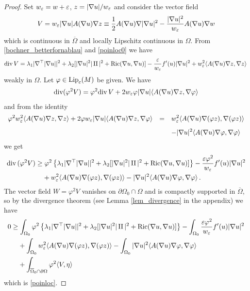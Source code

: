 \documentclass[10 pt,a4paper]{article}
\theoremstyle{definition}
\begin{document}
\begin{proof}
	Set $w_\varepsilon = w+\varepsilon$, $z = |\nabla u|/w_\varepsilon$ and consider the vector field
	\[
		V = w_\varepsilon |\nabla u| A(\nabla u) \nabla z \equiv \frac{1}{2} A(\nabla u)\nabla|\nabla u|^2 - \frac{|\nabla u|^2}{w_\varepsilon} A(\nabla u)\nabla w
	\]
	which is continuous in $\overline{\Omega}$ and locally Lipschitz continuous in $\Omega$. From \eqref{bochner_betterfornablau} and \eqref{poinloc0} we have
	\[
		\mathrm{div}\, V = \lambda_1|\nabla^\top|\nabla u||^2 + \lambda_2 [|\nabla u|^2|\operatorname{II}|^2 + \mathrm{Ric}(\nabla u,\nabla u)] - \frac{\varepsilon}{w_\varepsilon} f'(u) |\nabla u|^2 + w_\varepsilon^2 \langle A(\nabla u)\nabla z,\nabla z\rangle \, 
	\]
	weakly in $\Omega$. Let $\varphi\in\mathrm{Lip}_c(M)$ be given. We have
	\[
		\mathrm{div}(\varphi^2 V) = \varphi^2 \mathrm{div}\, V + 2 w_\varepsilon \varphi |\nabla u| \langle A(\nabla u)\nabla z, \nabla \varphi\rangle
	\]
	and from the identity
	\[
	\begin{array}{lcl}	
	\displaystyle \varphi^2 w_\varepsilon^2 \langle A(\nabla u)\nabla z,\nabla z\rangle + 2 \varphi w_\varepsilon |\nabla u| \langle A(\nabla u)\nabla z,\nabla \varphi\rangle & = & \displaystyle w_\varepsilon^2 \langle A(\nabla u)\nabla (\varphi z),\nabla(\varphi z)\rangle \\[0.3cm]
	& & \displaystyle - |\nabla u|^2 \langle A(\nabla u)\nabla\varphi,\nabla\varphi\rangle
	\end{array}
	\]
	we get
	\begin{equation}
		\begin{split}
			\mathrm{div}\,(\varphi^2 V) & \ge \varphi^2 \left\{\lambda_1|\nabla^\top|\nabla u||^2 + \lambda_2 [|\nabla u|^2|\operatorname{II}|^2 + \mathrm{Ric}(\nabla u,\nabla u)]\right\} - \frac{\varepsilon \varphi^2}{w_\varepsilon} f'(u)|\nabla u|^2 \\
			& \phantom{=\;} + w_\varepsilon^2 \langle A(\nabla u)\nabla (\varphi z),\nabla(\varphi z)\rangle - |\nabla u|^2 \langle A(\nabla u)\nabla\varphi,\nabla\varphi\rangle \, .
		\end{split}
	\end{equation}
	The vector field $W = \varphi^2 V$ vanishes on $\partial\Omega_0 \cap \Omega$ and is compactly supported in $\overline{\Omega}$, so by the divergence theorem (see Lemma \ref{lem_divergence} in the appendix) we have
	\begin{align*}
		0 & \geq \int_{\Omega_0} \varphi^2 \left\{\lambda_1|\nabla^\top|\nabla u||^2 + \lambda_2 [|\nabla u|^2|\operatorname{II}|^2 + \mathrm{Ric}(\nabla u,\nabla u)]\right\} - \int_{\Omega_0} \frac{\varepsilon \varphi^2}{w_\varepsilon} f'(u)|\nabla u|^2 \\
		& \phantom{=\;} + \int_{\Omega_0} w_\varepsilon^2 \langle A(\nabla u)\nabla (\varphi z),\nabla(\varphi z)\rangle - \int_{\Omega_0} |\nabla u|^2 \langle A(\nabla u)\nabla\varphi,\nabla\varphi\rangle \\
		& \phantom{=\;} + \int_{\overline{\Omega}_0\cap\partial\Omega} \varphi^2 \langle V,\eta\rangle
	\end{align*}
	which is \eqref{poinloc}.
	

\end{proof}
\end{document}
